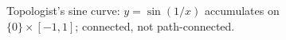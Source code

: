 \documentclass{article}
\begin{document}
\begin{figure}
  \centering
  
  \caption{Topologist's sine curve: \textcolor{red!75!black}{$y=\sin(1/x)$} accumulates on \textcolor{blue!70!black}{$\{0\}\times[-1,1]$}; connected, not path-connected.}
\end{figure}
\end{document}
